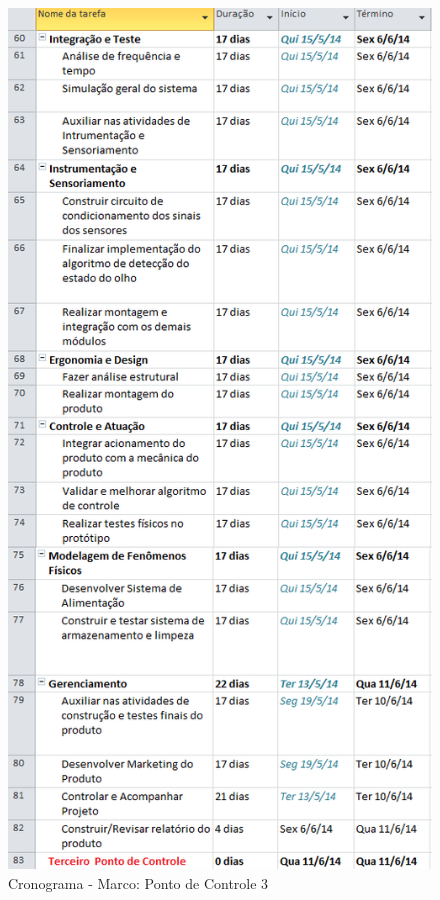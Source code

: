 \begin{figure}[H]
		\centering
			\includegraphics[scale=0.85]{figuras/cronograma3.png}
		\caption{Cronograma - Marco: Ponto de Controle 3}
		\label{ultimo}
\end{figure}

